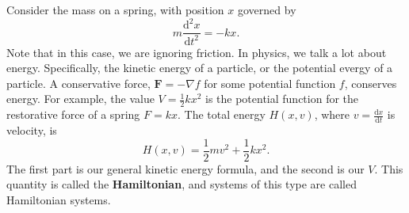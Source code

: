 Consider the mass on a spring, with position $x$ governed by
\[
	m \frac{\mathrm{d}^2x}{\mathrm{d}t^2} =-kx
.\]
Note that in this case, we are ignoring friction. In physics, we talk a lot about energy. Specifically, the kinetic energy of a particle, or the potential evergy of a particle. A conservative force, $\mathbf{F}=-\nabla f$ for some potential function $f$, conserves energy. For example, the value $V=\frac{1}{2}kx^2$ is the potential function for the restorative force of a spring $F=kx$. The total energy $H(x,v)$, where $v=\frac{\mathrm{d}x}{\mathrm{d}t} $ is velocity, is
\[
	H(x,v)=\frac{1}{2}mv^2+\frac{1}{2}kx^2
.\]
The first part is our general kinetic energy formula, and the second is our $V$. This quantity is called the \textbf{Hamiltonian}, and systems of this type are called Hamiltonian systems.
